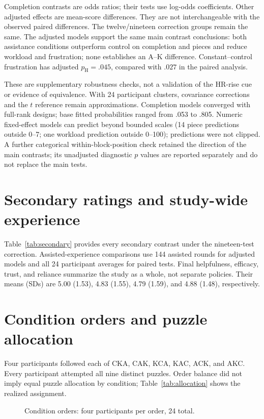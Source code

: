 \documentclass[sigconf,anonymous]{aamas}
\begin{document}
Completion contrasts are odds ratios; their tests use log-odds coefficients. Other adjusted effects are mean-score differences. They are not interchangeable with the observed paired differences. The twelve/nineteen correction groups remain the same. The adjusted models support the same main contrast conclusions: both assistance conditions outperform control on completion and pieces and reduce workload and frustration; none establishes an A--K difference. Constant--control frustration has adjusted $p_{\mathrm{H}}=.045$, compared with $.027$ in the paired analysis.


These are supplementary robustness checks, not a validation of the HR-rise cue or evidence of equivalence. With 24 participant clusters, covariance corrections and the $t$ reference remain approximations. Completion models converged with full-rank designs; base fitted probabilities ranged from .053 to .805. Numeric fixed-effect models can predict beyond bounded scales (14 piece predictions outside 0--7; one workload prediction outside 0--100); predictions were not clipped. A further categorical within-block-position check retained the direction of the main contrasts; its unadjusted diagnostic $p$ values are reported separately and do not replace the main tests.


\section{Secondary ratings and study-wide experience}
Table~\ref{tab:secondary} provides every secondary contrast under the nineteen-test correction. Assisted-experience comparisons use 144 assisted rounds for adjusted models and all 24 participant averages for paired tests. Final helpfulness, efficacy, trust, and reliance summarize the study as a whole, not separate policies. Their means (SDs) are 5.00 (1.53), 4.83 (1.55), 4.79 (1.59), and 4.88 (1.48), respectively.


\section{Condition orders and puzzle allocation}
Four participants followed each of CKA, CAK, KCA, KAC, ACK, and AKC. Every participant attempted all nine distinct puzzles. Order balance did not imply equal puzzle allocation by condition; Table~\ref{tab:allocation} shows the realized assignment.
\begin{figure}[htbp]
\centering
\begingroup
\fontsize{12}{13}\selectfont
\renewcommand{\small}{\fontsize{11}{12}\selectfont}
\resizebox{.75\linewidth}{!}{}
\endgroup
\caption{Condition orders: four participants per order, 24 total.}
\end{figure}

\end{document}
